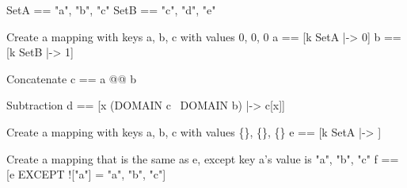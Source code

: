 \begin{tla}
SetA == {"a", "b", "c"}
SetB == {"c", "d", "e"}

\* Create a mapping with keys a, b, c with values 0, 0, 0
a == [k \in SetA |-> 0]
b == [k \in SetB |-> 1]

\* Concatenate 
c == a @@ b

\* Subtraction
d == [x \in (DOMAIN c \ DOMAIN b) |-> c[x]]

\* Create a mapping with keys a, b, c with values \{\}, \{\}, \{\}
e == [k \in SetA |-> {}]

\* Create a mapping that is the same as e, except key a's value is {"a", "b", "c"}
f == [e EXCEPT !["a"] = {"a", "b", "c"}] 

\end{tla}
\begin{tlatex}
%
%
\@pvspace{8.0pt}%
\@x{}%
%
\@xx{}%
%
%
\@pvspace{8.0pt}%
\@x{}%
%
\@xx{}%
%
\@pvspace{8.0pt}%
\@x{}%
%
\@xx{}%
\@pvspace{8.0pt}%
\@x{}%
%
\@xx{}%
%
\@pvspace{8.0pt}%
\@x{}%
%
\@xx{}%
\@pvspace{8.0pt}%
\end{tlatex}
